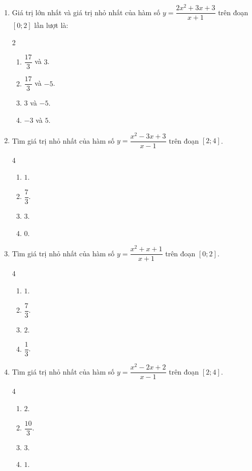 \documentclass[12pt]{article}
\begin{document}
\begin{enumerate}[label=\textbf{Câu \arabic*.}]
		\item Giá trị lớn nhất và giá trị nhỏ nhất của hàm số $y = \dfrac{2x^2 + 3x + 3}{x + 1}$ trên đoạn $[0; 2]$ lần lượt là:
		\begin{multicols}{2}
			\begin{enumerate}[label=\textbf{\Alph*.}]
				\item $\dfrac{17}{3}$ và $3$.
				\item $\dfrac{17}{3}$ và $-5$.
				\item $3$ và $-5$.
				\item $-3$ và $5$.
			\end{enumerate}
		\end{multicols}
		
		\item Tìm giá trị nhỏ nhất của hàm số $y = \dfrac{x^2 - 3x + 3}{x - 1}$ trên đoạn $[2; 4]$.
		\begin{multicols}{4}
			\begin{enumerate}[label=\textbf{\Alph*.}]
				\item $1$.
				\item $\dfrac{7}{3}$.
				\item $3$.
				\item $0$.
			\end{enumerate}
		\end{multicols}
		
		\item Tìm giá trị nhỏ nhất của hàm số $y = \dfrac{x^2 + x + 1}{x + 1}$ trên đoạn $[0; 2]$.
		\begin{multicols}{4}
			\begin{enumerate}[label=\textbf{\Alph*.}]
				\item $1$.
				\item $\dfrac{7}{3}$.
				\item $2$.
				\item $\dfrac{1}{3}$.
			\end{enumerate}
		\end{multicols}
		
		\item Tìm giá trị nhỏ nhất của hàm số $y = \dfrac{x^2 - 2x + 2}{x - 1}$ trên đoạn $[2; 4]$.
		\begin{multicols}{4}
			\begin{enumerate}[label=\textbf{\Alph*.}]
				\item $2$.
				\item $\dfrac{10}{3}$.
				\item $3$.
				\item $1$.
			\end{enumerate}
		\end{multicols}
		

\end{enumerate}
\end{document}
